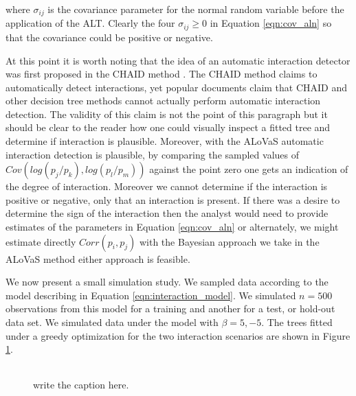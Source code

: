 where $\sigma_{ij}$ is the covariance parameter for the normal random variable before the application of the ALT. Clearly the four $\sigma_{ij} \geq 0$ in Equation \ref{eqn:cov_aln} so that the covariance could be positive or negative.  

At this point it is worth noting that the idea of an automatic interaction detector was first proposed in the CHAID method \cite{kass1975significance}. The CHAID method claims to automatically detect interactions, yet popular documents \cite{ville2006decision} claim that CHAID and other decision tree methods cannot actually perform automatic interaction detection. The validity of this claim is not the point of this paragraph but it should be clear to the reader how one could visually inspect a fitted tree and determine if interaction is plausible. Moreover, with the ALoVaS automatic interaction detection is plausible, by comparing the sampled values of $Cov(log(p_j/p_k), log(p_l/p_m) )$  against the point zero one gets an indication of the degree of interaction. Moreover we cannot determine if the interaction is positive or negative, only that an interaction is present. If there was a desire to determine the sign of the interaction then the analyst would need to provide estimates of the parameters in Equation \ref{eqn:cov_aln} or alternately, we might estimate directly $Corr(p_i, p_j)$ with the Bayesian approach we take in the ALoVaS method either approach is feasible. 

We now present a small simulation study. We sampled data according to the model describing in Equation \ref{eqn:interaction_model}. We simulated $n=500$ observations from this model for a training and another for a test, or hold-out data set. We simulated data under the model with $\beta =5, -5$. The trees fitted under a greedy optimization for the two interaction scenarios are shown in Figure \ref{fig:interaction_trees}. 

\begin{figure}
\begin{center} 
\begin{tabular}{cc}
\end{tabular}
\caption{write the caption here.}
\label{fig:interaction_trees}
\end{center}
\end{figure} 

